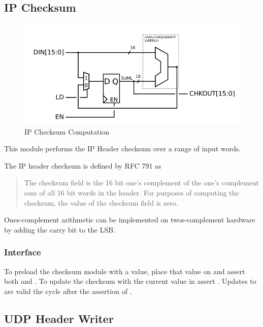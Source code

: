 \subsection{IP Checksum}

\begin{figure}
\begin{centering}
\includegraphics[scale=0.8]{ipchecksum.svg}
\end{centering}
\caption{IP Checksum Computation}
\label{ipchecksum}
\end{figure}

This module performs the IP Header checksum over a range of input words. 

The IP header checksum is defined by RFC 791 as

\begin{quote}
      The checksum field is the 16 bit one's complement of the one's
complement sum of all 16 bit words in the header.  For purposes of
computing the checksum, the value of the checksum field is zero.
\end{quote}

Ones-complement arithmetic can be implemented on twos-complement
hardware by adding the carry bit to the LSB.


\subsubsection{Interface}
To preload the checksum module with a value, place that value on
 and assert both  and . To
update the checksum with the current value in 
assert . Updates to  are valid the
cycle after the assertion of .

\subsection{UDP Header Writer}

